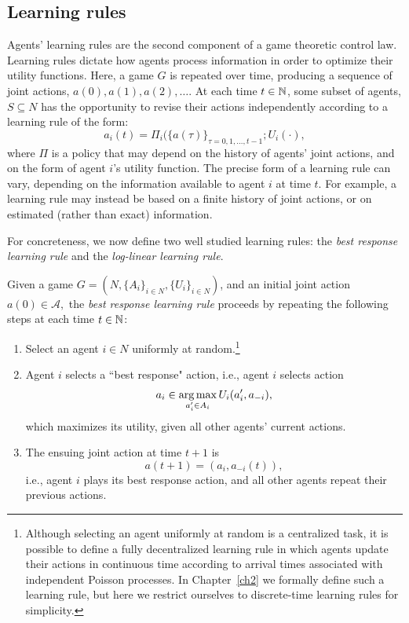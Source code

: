 \subsection{Learning rules}\label{s:learning rules}

Agents' learning rules are the second component of a game theoretic control law. Learning rules dictate how agents process information in order to optimize their utility functions. Here, a game $G$ is repeated over time, producing a sequence of joint actions, $a(0), a(1),a(2),\ldots.$ At each time $t\in\mathbb{N}$, some subset of agents, $S\subseteq N$ has the opportunity to revise their actions independently according to a learning rule of the form:
$$a_i(t) = \Pi_i(\{a(\tau)\}_{\tau=0,1,\ldots,t-1};U_i(\cdot),$$
where $\Pi$ is a policy that may depend on the history of agents' joint actions, and on the form of agent $i$'s utility function. The precise form of a learning rule can vary, depending on the information available to agent $i$ at time $t$. For example, a learning rule may instead be based on a finite history of joint actions, or on estimated (rather than exact) information.

For concreteness, we now define two well studied learning rules: the {\it best response learning rule} and the {\it log-linear learning rule}.

\begin{defn}
Given a game $G = \left(N,\{A_i\}_{i\in N},\{U_i\}_{i\in N}\right)$, and an initial joint action $a(0)\in \mathcal{A},$ the {\it best response learning rule} proceeds by repeating the following steps at each time $t\in \mathbb{N}$:
\begin{enumerate}
    \item Select an agent $i\in N$ uniformly at random.\footnote{Although selecting an agent uniformly at random is a centralized task, it is possible to define a fully decentralized learning rule in which agents update their actions in continuous time according to arrival times associated with independent Poisson processes. In Chapter~\ref{ch2} we formally define such a learning rule, but here we restrict ourselves to discrete-time learning rules for simplicity.}
    \item Agent $i$ selects a ``best response" action, i.e., agent $i$ selects action
    $$a_i\in \operatorname*{arg\,max}_{a_i^\prime\in A_i}U_i(a_i^\prime,a_{-i}),$$
    which maximizes its utility, given all other agents' current actions.
    \item The ensuing joint action at time $t+1$ is 
    $$a(t+1) = (a_i,a_{-i}(t)),$$ i.e., agent $i$ plays its best response action, and all other agents repeat their previous actions.
\end{enumerate}
\end{defn}

